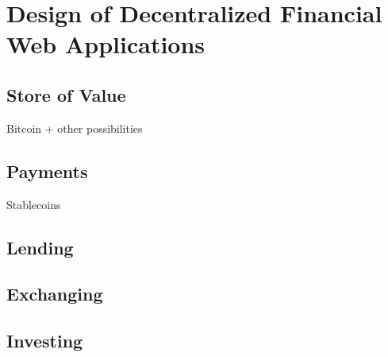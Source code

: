 \chapter{Design of Decentralized Financial Web Applications}
\label{cha:DesignDecentralizedFinancialWebApplications}

\section{Store of Value}
Bitcoin + other possibilities
\section{Payments}
Stablecoins
\section{Lending}
\section{Exchanging}
\section{Investing}